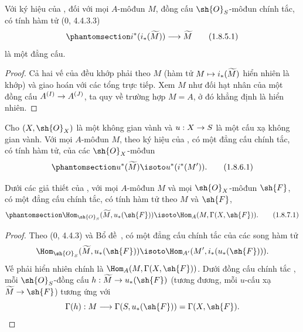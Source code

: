 \documentclass[oneside,10pt]{amsart}
\makeatletter
\newcommand{\ega@arrow}[2]{\mathchoice{#1}{#2}{#2}{#2}}
\let\ega@shortmapsto\mapsto
\renewcommand{\to}{\ega@arrow{\longrightarrow}{\rightarrow}}
\renewcommand{\mapsto}{\ega@arrow{\longmapsto}{\ega@shortmapsto}}
\newcommand{\oldpage}[2][]{\marginnote{\normalfont\footnotesize\textbf{#1}~|~#2}\ignorespaces}
\let\EGAOriginalLabel\label
\renewcommand{\label}[1]{\phantomsection\EGAOriginalLabel{#1}}
\makeatother
\begin{document}
\begin{lemma}[1.8.5]
\label{ega2:addendum:I.1.8.5}
Với ký hiệu của , đối với mọi $A$-môđun $M$, đồng cấu
$\sh{O}_S$-môđun chính tắc, có tính hàm tử (0, 4.4.3.3)
\begin{equation}
\label{ega2:addendum:I.1.8.5.1}
  i^*(i_*(\widetilde M))\to\widetilde M
\tag{1.8.5.1}
\end{equation}
là một đẳng cấu.
\end{lemma}

\begin{proof}
Cả hai vế của  đều khớp phải theo $M$ (hàm tử
$M\mapsto i_*(\widetilde M)$ hiển nhiên là khớp) và giao hoán với các
tổng trực tiếp. Xem $M$ như đối hạt nhân của một đồng cấu
$A^{(I)}\to A^{(J)}$, ta quy về trường hợp $M=A$, ở đó khẳng định là
hiển nhiên.
\end{proof}

\begin{corollary}[1.8.6]
\label{ega2:addendum:I.1.8.6}
Cho $(X,\sh{O}_X)$ là một không gian vành và $u:X\to S$ là một cấu xạ
\oldpage[II]{220}
không gian vành. Với mọi $A$-môđun $M$, theo ký hiệu của
, có một đẳng cấu chính tắc, có tính hàm tử, của các
$\sh{O}_X$-môđun
\begin{equation}
\label{ega2:addendum:I.1.8.6.1}
  u^*(\widetilde M)\isoto u^*(i^*(M')).
\tag{1.8.6.1}
\end{equation}
\end{corollary}

\begin{corollary}[1.8.7]
\label{ega2:addendum:I.1.8.7}
Dưới các giả thiết của , với mọi $A$-môđun $M$ và mọi
$\sh{O}_X$-môđun $\sh{F}$, có một đẳng cấu chính tắc, có tính hàm tử
theo $M$ và $\sh{F}$,
\begin{equation}
\label{ega2:addendum:I.1.8.7.1}
  \Hom_{\sh{O}_S}(\widetilde M,u_*(\sh{F}))
  \isoto\Hom_A(M,\Gamma(X,\sh{F})).
\tag{1.8.7.1}
\end{equation}
\end{corollary}

\begin{proof}
Theo (0, 4.4.3) và Bổ đề~, có một đẳng cấu chính tắc
của các song hàm tử
\[
  \Hom_{\sh{O}_S}(\widetilde M,u_*(\sh{F}))
  \isoto\Hom_{A'}(M',i_*(u_*(\sh{F}))).
\]
Vế phải hiển nhiên chính là $\Hom_A(M,\Gamma(X,\sh{F}))$. Dưới đồng
cấu chính tắc , mỗi $\sh{O}_S$-đồng cấu
$h:\widetilde M\to u_*(\sh{F})$ (tương đương, mỗi $u$-cấu xạ
$\widetilde M\to\sh{F}$) tương ứng với
\[
  \Gamma(h):M\to\Gamma(S,u_*(\sh{F}))=\Gamma(X,\sh{F}).
\]
\end{proof}
\end{document}

